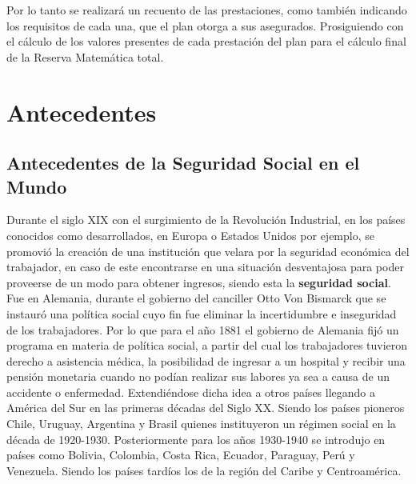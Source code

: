 \documentclass[12pt,letterpaper,titlepage]{article}
\begin{document}
{%

Por lo tanto se realizará un recuento de las prestaciones, como también indicando los requisitos de cada una, que el plan otorga a sus asegurados. Prosiguiendo con el cálculo de los valores presentes de cada prestación del plan para el cálculo final de la Reserva Matemática total. \bigskip

\newpage
\section{Antecedentes}

\subsection{Antecedentes de la Seguridad Social en el Mundo}

Durante el siglo XIX con el surgimiento de la Revolución Industrial, en los países conocidos como desarrollados, en Europa o Estados Unidos por ejemplo,  se promovió la creación de una institución que velara por la seguridad económica del trabajador, en caso de este encontrarse en una situación desventajosa para poder proveerse de un modo para obtener ingresos, siendo esta la \textbf{seguridad social}. \\

Fue en Alemania, durante el gobierno del canciller Otto Von Bismarck que se instauró una política social cuyo fin fue eliminar la incertidumbre e inseguridad de los trabajadores. Por lo que para el año 1881 el gobierno de Alemania fijó un programa en materia de política social, a partir del cual los trabajadores tuvieron derecho a asistencia médica, la posibilidad de ingresar a un hospital y recibir una pensión monetaria cuando no podían realizar sus labores ya sea a causa de un accidente o enfermedad. Extendiéndose dicha idea a otros países llegando a América del Sur en las primeras décadas del Siglo XX. Siendo los países pioneros Chile, Uruguay, Argentina y Brasil quienes instituyeron un régimen social en la década de 1920-1930. Posteriormente para los años 1930-1940 se introdujo en países como Bolivia, Colombia, Costa Rica, Ecuador, Paraguay, Perú y Venezuela. Siendo los países tardíos los de la región del Caribe y Centroamérica.\\

}
\end{document}
